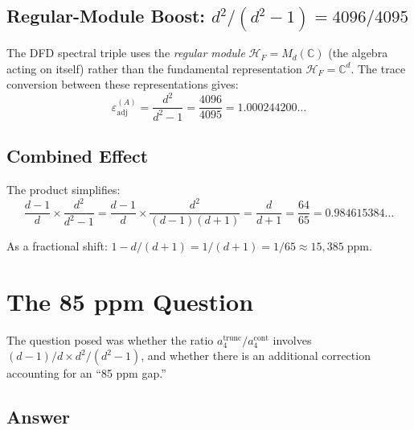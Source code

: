 \documentclass[12pt,a4paper]{article}
\begin{document}
\subsection{Regular-Module Boost: $d^2/(d^2-1) = 4096/4095$}

The DFD spectral triple uses the \emph{regular module}
$\mathcal{H}_F = M_d(\mathbb{C})$ (the algebra acting on itself)
rather than the fundamental representation $\mathcal{H}_F = \mathbb{C}^d$.
The trace conversion between these representations gives:
\begin{equation}
\boxed{\varepsilon_{\mathrm{adj}}^{(A)} = \frac{d^2}{d^2-1} = \frac{4096}{4095}
= 1.000244200\ldots}
\end{equation}

\subsection{Combined Effect}

The product simplifies:
\begin{equation}
\frac{d-1}{d} \times \frac{d^2}{d^2-1}
= \frac{d-1}{d} \times \frac{d^2}{(d-1)(d+1)}
= \frac{d}{d+1}
= \frac{64}{65}
= 0.984615384\ldots
\label{eq:combined}
\end{equation}

As a fractional shift: $1 - d/(d+1) = 1/(d+1) = 1/65 \approx 15{,}385\;\mathrm{ppm}$.

\section{The 85 ppm Question}
\label{sec:85ppm}

The question posed was whether the ratio $a_4^{\mathrm{trunc}}/a_4^{\mathrm{cont}}$
involves $(d-1)/d \times d^2/(d^2-1)$, and whether there is an additional
correction accounting for an ``85 ppm gap.''

\subsection{Answer}
\end{document}
